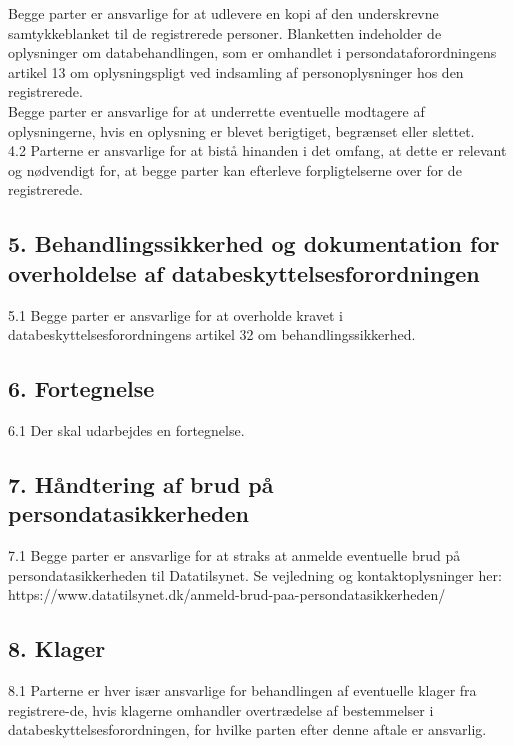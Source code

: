 \documentclass[11pt, a4paper]{article}
\newcounter{fortegnelse}
\begin{document}
Begge parter er ansvarlige for at udlevere en kopi af den underskrevne samtykkeblanket til de registrerede personer. Blanketten indeholder de oplysninger om databehandlingen, som er omhandlet i persondataforordningens artikel 13 om oplysningspligt ved indsamling af personoplysninger hos den registrerede.\\

Begge parter er ansvarlige for at underrette eventuelle modtagere af oplysningerne, hvis en oplysning er blevet berigtiget, begrænset eller slettet.\\

4.2 Parterne er ansvarlige for at bistå hinanden i det omfang, at dette er relevant og nødvendigt for, at begge parter kan efterleve forpligtelserne over for de registrerede.

\subsection*{5. Behandlingssikkerhed og dokumentation for overholdelse af databeskyttelsesforordningen}

5.1 Begge parter er ansvarlige for at overholde kravet i databeskyttelsesforordningens artikel 32 om behandlingssikkerhed.

\subsection*{6. Fortegnelse}

6.1 Der skal udarbejdes en fortegnelse.

\subsection*{7. Håndtering af brud på persondatasikkerheden}

7.1 Begge parter er ansvarlige for at straks at anmelde eventuelle brud på persondatasikkerheden til Datatilsynet. Se vejledning og kontaktoplysninger her:\\{\color{blue}https://www.datatilsynet.dk/anmeld-brud-paa-persondatasikkerheden/}

\subsection*{8. Klager}

8.1 Parterne er hver især ansvarlige for behandlingen af eventuelle klager fra registrere-de, hvis klagerne omhandler overtrædelse af bestemmelser i databeskyttelsesforordningen, for hvilke parten efter denne aftale er ansvarlig.
\end{document}
